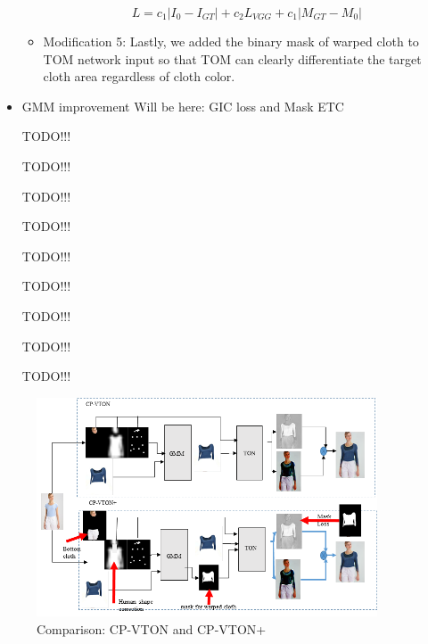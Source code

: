 \begin{itemize}
\begin{itemize}
\begin{equation}
L=c_1 |I_0-I_{GT} |+  c_2 L_{VGG}+c_1 |M_{GT}-M_0 |       
\end{equation}

\item Modification 5: Lastly, we added the binary mask of warped cloth to TOM network input so that TOM can clearly differentiate the target cloth area regardless of cloth color.  

\end{itemize}

\item GMM improvement Will be here: GIC loss and Mask ETC

TODO!!!

TODO!!!

TODO!!!

TODO!!!

TODO!!!

TODO!!!

TODO!!!

TODO!!!

TODO!!!






















\end{itemize}


\begin{figure}
\centering
\includegraphics[height=6.5cm, scale=1]{figures/cpvton+pipeline.png}   
\caption{Comparison: CP-VTON and CP-VTON+}
\label{fig:piepline}
\end{figure}